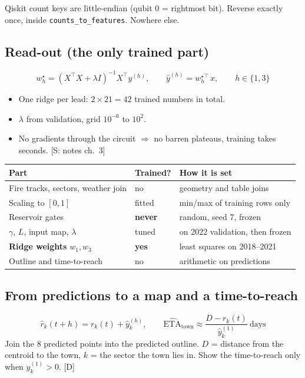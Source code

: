 \documentclass[11pt,a4paper]{article}
\newcommand{\tagbox}[2]{{\footnotesize\color{#1}\textsf{[#2]}}}
\newcommand{\supp}[1]{\tagbox{ForestGreen!70!black}{S: #1}}  %
\newcommand{\ours}{\tagbox{NavyBlue}{D}}                      %
\newcommand{\code}[1]{\texttt{\small #1}}
\begin{document}
\begin{watch}
Qiskit count keys are little-endian (qubit 0 = rightmost bit). Reverse exactly once, inside
\code{counts\_to\_features}. Nowhere else.
\end{watch}

\subsection{Read-out (the only trained part)}
\[
w_h^\star=(X^\top X+\lambda I)^{-1}X^\top y^{(h)},
\qquad
\hat y^{(h)}=w_h^{\star\top}\,x,
\qquad h\in\{1,3\}
\]
\begin{itemize}
\item One ridge per lead: $2\times21=42$ trained numbers in total.
\item $\lambda$ from validation, grid $10^{-6}$ to $10^{2}$.
\item No gradients through the circuit $\Rightarrow$ no barren plateaus, training takes seconds. \supp{notes ch.~3}
\end{itemize}

\begin{center}\small
\begin{tabularx}{\linewidth}{@{}l l Y@{}}
\toprule
\textbf{Part} & \textbf{Trained?} & \textbf{How it is set}\\
\midrule
Fire tracks, sectors, weather join & no & geometry and table joins\\
Scaling to $[0,1]$ & fitted & min/max of training rows only\\
Reservoir gates & \textbf{never} & random, seed 7, frozen\\
$\gamma$, $L$, input map, $\lambda$ & tuned & on 2022 validation, then frozen\\
\textbf{Ridge weights} $w_1,w_3$ & \textbf{yes} & least squares on 2018--2021\\
Outline and time-to-reach & no & arithmetic on predictions\\
\bottomrule
\end{tabularx}
\end{center}

\subsection{From predictions to a map and a time-to-reach}
\[
\hat r_k(t+h)=r_k(t)+\hat y_k^{(h)},
\qquad
\widehat{\mathrm{ETA}}_{\text{town}}\approx\frac{D-r_k(t)}{\hat y_k^{(1)}}\ \text{days}
\]
Join the 8 predicted points into the predicted outline. $D$ = distance from the centroid to the town, $k$ = the sector
the town lies in. Show the time-to-reach only when $\hat y_k^{(1)}>0$. \ours
\end{document}
